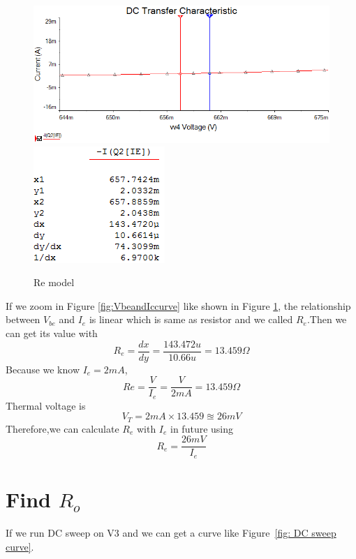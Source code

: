 \begin{figure}[htbp]
	\centering
	\includegraphics[scale=0.7]{"../Photo/Chap1/Re model"}\\[0.5cm]
	\includegraphics[scale=1]{"../Photo/Chap1/Re model data"}
	\caption{Re model}
	\label{fig:Re model}
\end{figure}

If we zoom in Figure \ref{fig:VbeandIccurve} like shown in Figure \ref{fig:Re model}, the relationship between $ V_{be} $ and $ I_e $ is linear which is same as resistor and we called $ R_e $.Then we can get its value with
\[ R_e = \frac{dx}{dy} = \frac{143.472u}{10.66u} = 13.459 \Omega\]
Because we know $ I_e = 2mA $, 
\[ Re = \frac{V}{I_e} = \frac{V}{2mA}=13.459\Omega\]
Thermal voltage is
\[ V_T = 2mA \times 13.459 \approxeq 26mV \] 
Therefore,we can calculate $ R_{e} $ with $ I_e $ in future using
\begin{equation}
	R_{e} = \frac{26 mV}{I_{e}}
\end{equation}

\section{Find $R_o$} %
\label{sec:find_Ro}


If we run DC sweep on V3 and we can get a curve like Figure~\ref{fig: DC sweep curve}.


